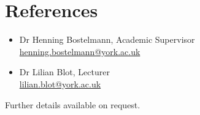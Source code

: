 \documentclass[11pt,a4paper]{article}
\newcommand{\email}[1]{\href{mailto:#1}{#1}}
\begin{document}
\section*{References}

\begin{itemize}[label={}]
\item Dr Henning Bostelmann, Academic Supervisor \hfill \\
  \indent \email{henning.bostelmann@york.ac.uk}
\item Dr Lilian Blot, Lecturer \hfill \\
  \indent \email{lilian.blot@york.ac.uk}
\end{itemize}

Further details available on request.
\end{document}
